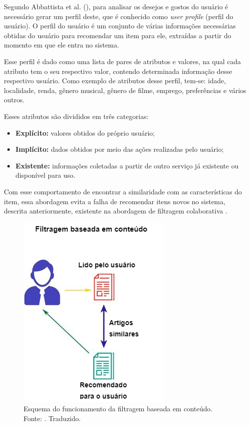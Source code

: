 Segundo Abbattista et al. (\citeyear{Abbattista:2002}), para analisar os desejos e gostos do usuário é necessário gerar um perfil deste, que é conhecido como \textit{user profile} (perfil do usuário). O perfil do usuário é um conjunto de várias informações necessárias obtidas do usuário para recomendar um item para ele, extraídas a partir do momento em que ele entra no sistema.

Esse perfil é dado como uma lista de pares de atributos e valores, na qual cada atributo tem o seu respectivo valor, contendo determinada informação desse respectivo usuário. Como exemplo de atributos desse perfil, tem-se: idade, localidade, renda, gênero musical, gênero de filme, emprego, preferências e vários outros.

Esses atributos são divididos em três categorias:
\begin{itemize}
    \item \textbf{Explícito:} valores obtidos do próprio usuário;

    \item \textbf{Implícito:} dados obtidos por meio das ações realizadas pelo usuário;

    \item \textbf{Existente:} informações coletadas a partir de outro serviço já existente ou disponível para uso.
\end{itemize}

Com esse comportamento de encontrar a similaridade com as características do item, essa abordagem evita a falha de recomendar itens novos no sistema, descrita anteriormente, existente na abordagem de filtragem colaborativa \cite{Luk:2019}.

\begin{figure}[H]
    \centering
    \includegraphics[scale=0.7]{figuras/referencial_teorico/content_based.png}
    \caption[Esquema do funcionamento da filtragem baseada em conteúdo]{Esquema do funcionamento da filtragem baseada em conteúdo. Fonte: \cite{Jain:2019}. Traduzido.}
    \label{fig:content_based}
\end{figure}

